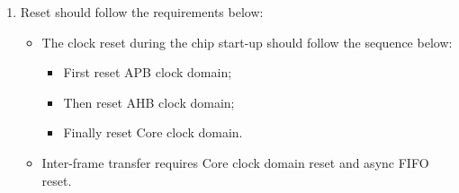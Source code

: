 \documentclass[main\_\_EN.tex]{subfiles}
\begin{document}
\begin{enumerate}
    Here are the specific operation steps in the RX unit:
    \begin{itemize}
        \item Clear \hyperref[fielddesc:PCRPARLCLKRXEN]{PCR\_PARL\_CLK\_RX\_EN} to turn off RX Core clock domain;
        \item Write 1 to \hyperref[fielddesc:PARLIORXSTART]{PARL\_IO\_RX\_START};
        \item Set \hyperref[fielddesc:PCRPARLCLKRXEN]{PCR\_PARL\_CLK\_RX\_EN} to turn on RX Core clock domain;
        \item Operate the external device to start sending data;
        \item Clear \hyperref[fielddesc:PCRPARLCLKRXEN]{PCR\_PARL\_CLK\_RX\_EN} to turn off RX Core clock domain;
        \item Write 0 to \hyperref[fielddesc:PARLIORXSTART]{PARL\_IO\_RX\_START}.
    \end{itemize}
    Here are the specific operation steps in the TX unit:
    \begin{itemize}
        \item Clear \hyperref[fielddesc:PCRPARLCLKTXEN]{PCR\_PARL\_CLK\_TX\_EN} to turn off TX Core clock domain;
        \item Write 1 to \hyperref[fielddesc:PARLIOTXSTART]{PARL\_IO\_TX\_START};
        \item Set \hyperref[fielddesc:PCRPARLCLKTXEN]{PCR\_PARL\_CLK\_TX\_EN} to turn on TX Core clock domain;
        \item Operate the external device to start receiving data;
        \item Clear \hyperref[fielddesc:PCRPARLCLKTXEN]{PCR\_PARL\_CLK\_TX\_EN} to turn off TX Core clock domain;
        \item Write 0 to \hyperref[fielddesc:PARLIOTXSTART]{PARL\_IO\_TX\_START}.
    \end{itemize}
    
    \item Reset should follow the requirements below:
    \begin{itemize}
        \item The clock reset during the chip start-up should follow the sequence below:
        \begin{itemize}
            \item First reset APB clock domain;
            \item Then reset AHB clock domain;
            \item Finally reset Core clock domain.
        \end{itemize}
        \item Inter-frame transfer requires Core clock domain reset and async FIFO reset.
    \end{itemize}
\end{enumerate}
\end{document}
